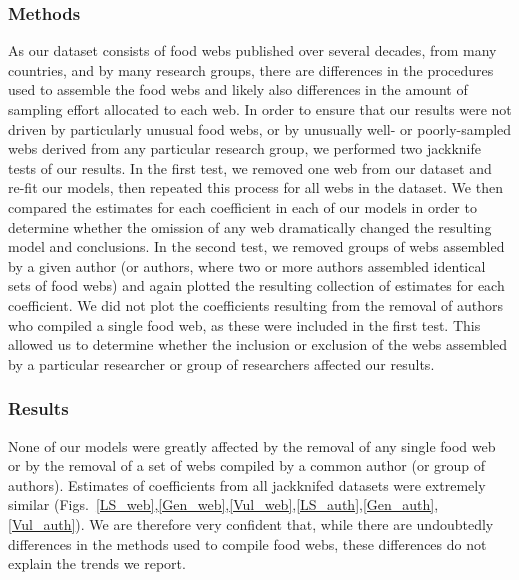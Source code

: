 \documentclass[12pt]{article}
\begin{document}
  \subsubsection*{Methods}
    As our dataset consists of food webs published over several decades, from 
    many countries, and by many research groups, there are
    differences in the procedures used to assemble the food
    webs and likely also differences in the amount of
    sampling effort allocated to each web. In order to 
    ensure that our results were not driven by
    particularly unusual food webs, or by unusually well- or poorly-sampled webs 
    derived from any particular research group, we performed two jackknife tests of our 
    results. In the first test, we removed one web from our dataset and re-fit 
    our models, then repeated this process for all webs in the dataset. We then 
    compared the estimates for each coefficient in each of our models in order to 
    determine whether the omission of any web dramatically changed the resulting 
    model and conclusions. In the second test, we removed groups of webs assembled by a given 
    author (or authors, where two or more authors assembled identical sets of 
    food webs) and again plotted the resulting collection of estimates for each
    coefficient. We did not plot the coefficients resulting from the removal of
    authors who compiled a single food web, as these were included in the first
    test. This allowed us to determine whether the inclusion or exclusion
    of the webs assembled by a particular researcher or group of researchers
    affected our results.

  \subsubsection*{Results}

    None of our models were greatly affected by the removal of any single food web
    or by the removal of a set of webs compiled by a common author (or group of
    authors).
    Estimates of coefficients from all jackknifed datasets were extremely
    similar (Figs.~\ref{LS_web},\ref{Gen_web},\ref{Vul_web},\ref{LS_auth},\ref{Gen_auth},\ref{Vul_auth}). 
    We are therefore very confident that, while there are undoubtedly differences 
    in the methods used to compile food webs, these differences do not explain the trends we report.

  \newpage
\end{document}
